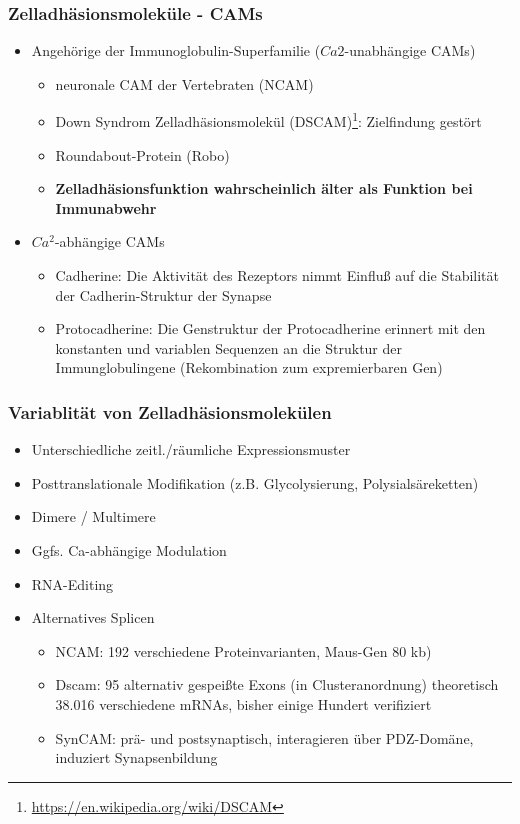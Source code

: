 \subsubsection{Zelladhäsionsmoleküle - CAMs}

\begin{itemize}
	\item Angehörige der Immunoglobulin-Superfamilie ($Ca2$-unabhängige CAMs)
	\begin{itemize}
		\item neuronale CAM der Vertebraten (NCAM)
		\item Down Syndrom Zelladhäsionsmolekül (DSCAM)\footnote{\url{https://en.wikipedia.org/wiki/DSCAM}}: Zielfindung gestört
		\item Roundabout-Protein (Robo)
		\item \textbf{Zelladhäsionsfunktion wahrscheinlich älter als Funktion bei Immunabwehr}
	\end{itemize}
	\item $Ca^2$-abhängige CAMs
		\begin{itemize}
			\item Cadherine: Die Aktivität des Rezeptors nimmt Einfluß
auf die Stabilität der Cadherin-Struktur der Synapse
			\item Protocadherine: Die Genstruktur der Protocadherine erinnert mit den konstanten und variablen Sequenzen an die Struktur der Immunglobulingene (Rekombination zum expremierbaren Gen)
		\end{itemize}
\end{itemize}

\subsubsection{Variablität von Zelladhäsionsmolekülen}
\begin{itemize}
	\item Unterschiedliche zeitl./räumliche Expressionsmuster
	\item Posttranslationale Modifikation (z.B. Glycolysierung, Polysialsäreketten)
	\item Dimere / Multimere
	\item Ggfs. Ca-abhängige Modulation
	\item RNA-Editing
	\item Alternatives Splicen
	\begin{itemize}
		\item NCAM: 192 verschiedene Proteinvarianten, Maus-Gen 80 kb)
		\item Dscam: 95 alternativ gespeißte Exons (in Clusteranordnung) theoretisch 38.016 verschiedene mRNAs, bisher einige Hundert verifiziert
		\item SynCAM: prä- und postsynaptisch, interagieren über PDZ-Domäne, induziert Synapsenbildung
	\end{itemize}
\end{itemize}

